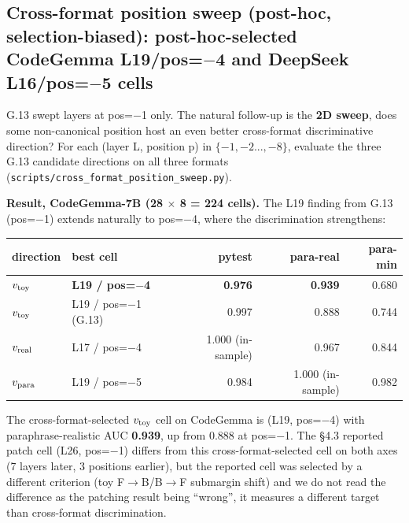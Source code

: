 \documentclass[
  11pt,
  a4paper]{article}
\newcounter{none} %
\begin{document}
\subsection{Cross-format position sweep (post-hoc, selection-biased):
post-hoc-selected CodeGemma L19/pos=\ensuremath{-}4 and DeepSeek L16/pos=\ensuremath{-}5
cells}\label{cross-format-position-sweep-post-hoc-selection-biased-post-hoc-selected-codegemma-l19pos4-and-deepseek-l16pos5-cells}

G.13 swept layers at pos=\ensuremath{-}1 only. The natural follow-up is the
\textbf{2D sweep}, does some non-canonical position host an even better
cross-format discriminative direction? For each (layer L, position p) in
\(\{-1, -2..., -8\}\), evaluate the three G.13 candidate directions on
all three formats (\texttt{scripts/cross\_format\_position\_sweep.py}).

\textbf{Result, CodeGemma-7B (28 \ensuremath{\times} 8 = 224 cells).} The L19 finding from
G.13 (pos=\ensuremath{-}1) extends naturally to pos=\ensuremath{-}4, where the discrimination
strengthens:

{\def\LTcaptype{none} %
\begin{longtable}[]{@{}llrrr@{}}
\toprule\noalign{}
direction & best cell & pytest & para-real & para-min \\
\midrule\noalign{}
\endhead
\bottomrule\noalign{}
\endlastfoot
\(v_{\rm toy}\) & \textbf{L19 / pos=\ensuremath{-}4} & \textbf{0.976} &
\textbf{0.939} & 0.680 \\
\(v_{\rm toy}\) & L19 / pos=\ensuremath{-}1 (G.13) & 0.997 & 0.888 & 0.744 \\
\(v_{\rm real}\) & L17 / pos=\ensuremath{-}4 & 1.000 (in-sample) & 0.967 & 0.844 \\
\(v_{\rm para}\) & L19 / pos=\ensuremath{-}5 & 0.984 & 1.000 (in-sample) & 0.982 \\
\end{longtable}
}

The cross-format-selected \(v_{\rm toy}\) cell on CodeGemma is (L19,
pos=\ensuremath{-}4) with paraphrase-realistic AUC \textbf{0.939}, up from 0.888 at
pos=\ensuremath{-}1. The \S{}4.3 reported patch cell (L26, pos=\ensuremath{-}1) differs from this
cross-format-selected cell on both axes (7 layers later, 3 positions
earlier), but the reported cell was selected by a different criterion
(toy F\ensuremath{\rightarrow}B/B\ensuremath{\rightarrow}F submargin shift) and we do not read the difference as the
patching result being ``wrong'', it measures a different target than
cross-format discrimination.
\end{document}
